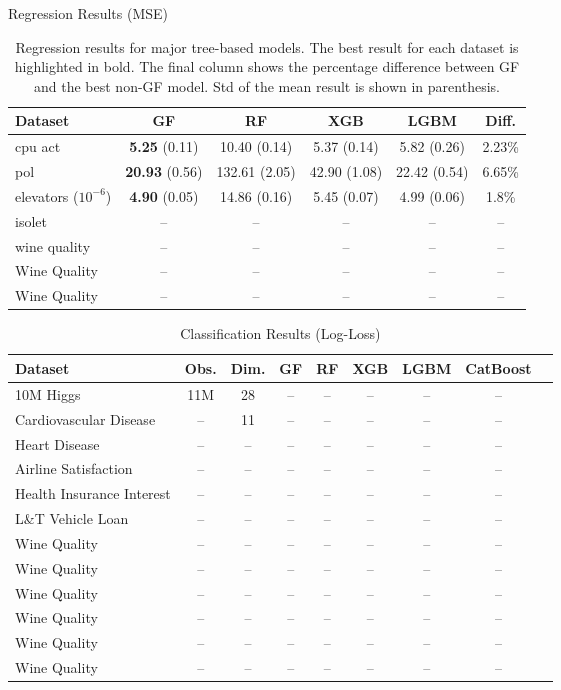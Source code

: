\documentclass{article}
\begin{document}
\begin{table}[ht]
    \centering
    \caption{Regression Results (MSE)}
    \begin{tabular}{lccccc}
    \hline
    Dataset & GF & RF & XGB & LGBM & Diff. \\
    \hline
    cpu act          & \textbf{5.25} (0.11) & 10.40 (0.14) & 5.37 (0.14) & 5.82 (0.26) & 2.23\% \\
    pol           & \textbf{20.93} (0.56) & 132.61 (2.05) & 42.90 (1.08) & 22.42 (0.54) & 6.65\% \\
    elevators ($10^{-6}$)          & \textbf{4.90} (0.05) & 14.86 (0.16) & 5.45 (0.07) & 4.99 (0.06) & 1.8\% \\
    isolet          & -- & -- & -- & -- & -- \\
    wine quality          & -- & -- & -- & -- & --\\
    Wine Quality          & -- & -- & -- & -- & --\\
    Wine Quality          & -- & -- & -- & -- & -- \\
    \hline
    \end{tabular}
    \caption{Regression results for major tree-based models. The best result for each dataset is highlighted in bold. The final column shows the percentage difference between GF and the best non-GF model.
    Std of the mean result is shown in parenthesis.}
    \label{tab:regression_results}
    \end{table}
\begin{table}[ht]
    \centering
    \caption{Classification Results (Log-Loss)}
    \begin{tabular}{lcccccccc}
    \hline
    Dataset & Obs. & Dim. & GF & RF & XGB & LGBM & CatBoost \\
    \hline
    10M Higgs & 11M & 28 & -- & -- & -- & -- & -- \\
    Cardiovascular Disease          & -- & 11 & -- & -- & -- & -- & -- \\
    Heart Disease          & -- & -- & -- & -- & -- & -- & -- \\
    Airline Satisfaction          & -- & -- & -- & -- & -- & -- & -- \\
    Health Insurance Interest          & -- & -- & -- & -- & -- & -- & -- \\
    L\&T Vehicle Loan          & -- & -- & -- & -- & -- & -- & -- \\
    Wine Quality          & -- & -- & -- & -- & -- & -- & -- \\
    Wine Quality          & -- & -- & -- & -- & -- & -- & -- \\
    Wine Quality          & -- & -- & -- & -- & -- & -- & -- \\
    Wine Quality          & -- & -- & -- & -- & -- & -- & -- \\
    Wine Quality          & -- & -- & -- & -- & -- & -- & -- \\
    Wine Quality          & -- & -- & -- & -- & -- & -- & -- \\
    \hline
    \end{tabular}
    \label{tab:classification_results}
    \end{table}
\end{document}
